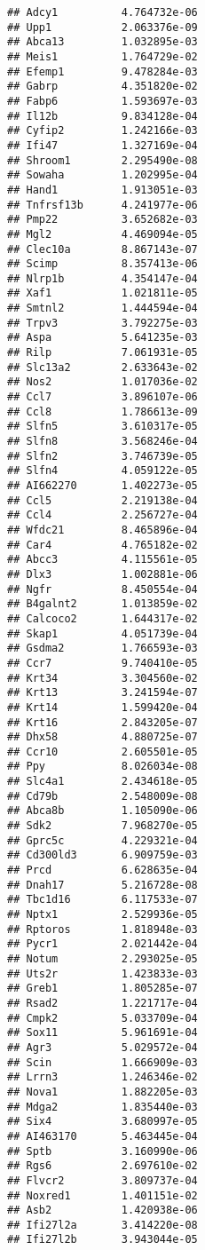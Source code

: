 \documentclass[
]{article}
\begin{document}
\begin{verbatim}
## Adcy1          4.764732e-06
## Upp1           2.063376e-09
## Abca13         1.032895e-03
## Meis1          1.764729e-02
## Efemp1         9.478284e-03
## Gabrp          4.351820e-02
## Fabp6          1.593697e-03
## Il12b          9.834128e-04
## Cyfip2         1.242166e-03
## Ifi47          1.327169e-04
## Shroom1        2.295490e-08
## Sowaha         1.202995e-04
## Hand1          1.913051e-03
## Tnfrsf13b      4.241977e-06
## Pmp22          3.652682e-03
## Mgl2           4.469094e-05
## Clec10a        8.867143e-07
## Scimp          8.357413e-06
## Nlrp1b         4.354147e-04
## Xaf1           1.021811e-05
## Smtnl2         1.444594e-04
## Trpv3          3.792275e-03
## Aspa           5.641235e-03
## Rilp           7.061931e-05
## Slc13a2        2.633643e-02
## Nos2           1.017036e-02
## Ccl7           3.896107e-06
## Ccl8           1.786613e-09
## Slfn5          3.610317e-05
## Slfn8          3.568246e-04
## Slfn2          3.746739e-05
## Slfn4          4.059122e-05
## AI662270       1.402273e-05
## Ccl5           2.219138e-04
## Ccl4           2.256727e-04
## Wfdc21         8.465896e-04
## Car4           4.765182e-02
## Abcc3          4.115561e-05
## Dlx3           1.002881e-06
## Ngfr           8.450554e-04
## B4galnt2       1.013859e-02
## Calcoco2       1.644317e-02
## Skap1          4.051739e-04
## Gsdma2         1.766593e-03
## Ccr7           9.740410e-05
## Krt34          3.304560e-02
## Krt13          3.241594e-07
## Krt14          1.599420e-04
## Krt16          2.843205e-07
## Dhx58          4.880725e-07
## Ccr10          2.605501e-05
## Ppy            8.026034e-08
## Slc4a1         2.434618e-05
## Cd79b          2.548009e-08
## Abca8b         1.105090e-06
## Sdk2           7.968270e-05
## Gprc5c         4.229321e-04
## Cd300ld3       6.909759e-03
## Prcd           6.628635e-04
## Dnah17         5.216728e-08
## Tbc1d16        6.117533e-07
## Nptx1          2.529936e-05
## Rptoros        1.818948e-03
## Pycr1          2.021442e-04
## Notum          2.293025e-05
## Uts2r          1.423833e-03
## Greb1          1.805285e-07
## Rsad2          1.221717e-04
## Cmpk2          5.033709e-04
## Sox11          5.961691e-04
## Agr3           5.029572e-04
## Scin           1.666909e-03
## Lrrn3          1.246346e-02
## Nova1          1.882205e-03
## Mdga2          1.835440e-03
## Six4           3.680997e-05
## AI463170       5.463445e-04
## Sptb           3.160990e-06
## Rgs6           2.697610e-02
## Flvcr2         3.809737e-04
## Noxred1        1.401151e-02
## Asb2           1.420938e-06
## Ifi27l2a       3.414220e-08
## Ifi27l2b       3.943044e-05

\end{verbatim}
\end{document}
